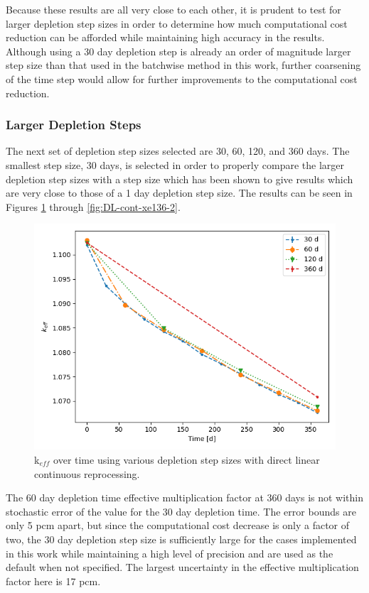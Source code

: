 Because these results are all very close to each other, it is prudent to test for larger depletion step sizes in order to determine how much computational cost reduction can be afforded while maintaining high accuracy in the results. Although using a 30 day depletion step is already an order of magnitude larger step size than that used in the batchwise method in this work, further coarsening of the time step would allow for further improvements to the computational cost reduction.

\subsubsection{Larger Depletion Steps}

The next set of depletion step sizes selected are 30, 60, 120, and 360 days. The smallest step size, 30 days, is selected in order to properly compare the larger depletion step sizes with a step size which has been shown to give results which are very close to those of a 1 day depletion step size. The results can be seen in Figures \ref{fig:DL-cont-k-2} through \ref{fig:DL-cont-xe136-2}.

\begin{figure}[H]
  \centering
  \includegraphics[scale=0.7]{images/DL_NSTEP_keff-large.png}
  \caption{k$_{eff}$ over time using various depletion step sizes with direct linear continuous reprocessing.}
   \label{fig:DL-cont-k-2}
\end{figure}

The 60 day depletion time effective multiplication factor at 360 days is not within stochastic error of the value for the 30 day depletion time. The error bounds are only 5 pcm apart, but since the computational cost decrease is only a factor of two, the 30 day depletion step size is sufficiently large for the cases implemented in this work while maintaining a high level of precision and are used as the default when not specified.
The largest uncertainty in the effective multiplication factor here is 17 pcm.

